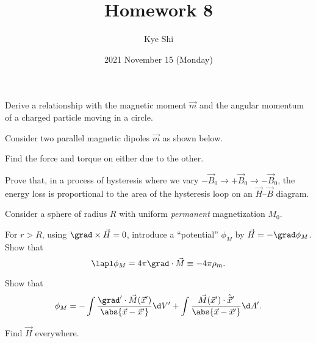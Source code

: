 \documentclass{phys151}
\title{Homework 8}
\date{2021 November 15 (Monday)}
\author{Kye Shi}
\begin{document}
\begin{problem}
  Derive a relationship with the magnetic moment \(\vec m\) and the angular
  momentum of a charged particle moving in a circle.
\end{problem}

\begin{solution}

\end{solution}

\begin{problem}
  Consider two parallel magnetic dipoles \(\vec m\) as shown below.
  \begin{center}
  \end{center}
  Find the force and torque on either due to the other.
\end{problem}

\begin{solution}

\end{solution}

\begin{problem}
  Prove that, in a process of hysteresis where we vary \(-\vec B_0 \to +\vec
  B_0 \to -\vec B_0\), the energy loss is proportional to the area of the
  hysteresis loop on an \(\vec H\)--\(\vec B\) diagram.
\end{problem}

\begin{solution}

\end{solution}

\begin{problem}
  Consider a sphere of radius \(R\) with uniform \emph{permanent} magnetization
  \(M_0\).
  \begin{subproblems}
    \item For \(r>R\), using \(\grad\times\vec H=0\), introduce a ``potential''
      \(\phi_M\) by \(\vec H=-\grad\phi_M\).  Show that
      \[
        \lapl \phi_M = 4\pi \grad\cdot\vec M \equiv -4\pi\rho_m.
      \]
    \item Show that
      \[
        \phi_M
        = -\int \frac{\grad' \cdot \vec M(\vec x')} {\abs{\vec x-\vec x'}} \d V'
        + \int \frac {\vec M(\vec x') \cdot \hat{\vec x}'} {\abs{\vec x-\vec x'}} \d A'.
      \]
    \item Find \(\vec H\) everywhere.
  \end{subproblems}
\end{problem}
\end{document}
